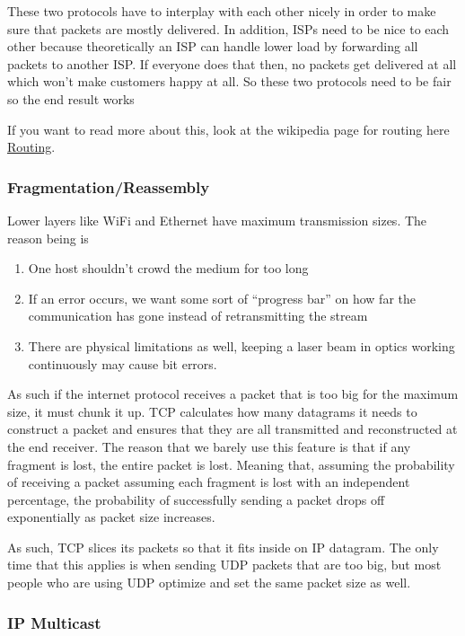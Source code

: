 \documentclass[]{article}
\begin{document}
These two protocols have to interplay with each other nicely in order to
make sure that packets are mostly delivered. In addition, ISPs need to
be nice to each other because theoretically an ISP can handle lower load
by forwarding all packets to another ISP. If everyone does that then, no
packets get delivered at all which won't make customers happy at all. So
these two protocols need to be fair so the end result works

If you want to read more about this, look at the wikipedia page for
routing here \href{https://en.wikipedia.org/wiki/Routing}{Routing}.

\subsubsection{Fragmentation/Reassembly}\label{fragmentationreassembly}

Lower layers like WiFi and Ethernet have maximum transmission sizes. The
reason being is

\begin{enumerate}
\item
  One host shouldn't crowd the medium for too long
\item
  If an error occurs, we want some sort of ``progress bar'' on how far
  the communication has gone instead of retransmitting the stream
\item
  There are physical limitations as well, keeping a laser beam in optics
  working continuously may cause bit errors.
\end{enumerate}

As such if the internet protocol receives a packet that is too big for
the maximum size, it must chunk it up. TCP calculates how many datagrams
it needs to construct a packet and ensures that they are all transmitted
and reconstructed at the end receiver. The reason that we barely use
this feature is that if any fragment is lost, the entire packet is lost.
Meaning that, assuming the probability of receiving a packet assuming
each fragment is lost with an independent percentage, the probability of
successfully sending a packet drops off exponentially as packet size
increases.

As such, TCP slices its packets so that it fits inside on IP datagram.
The only time that this applies is when sending UDP packets that are too
big, but most people who are using UDP optimize and set the same packet
size as well.

\subsubsection{IP Multicast}\label{ip-multicast}
\end{document}
